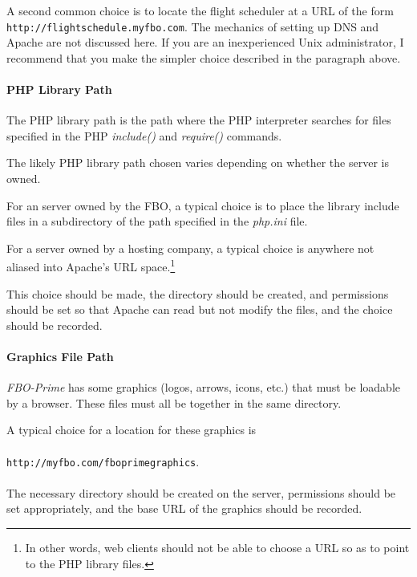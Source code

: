 \documentclass[letterpaper,10pt,titlepage]{article}
\newcommand{\productbasename}{FBO-Prime}
\begin{document}
A second common choice is to locate the flight scheduler at a URL of the form
\texttt{http://flightschedule.myfbo.com}.  The mechanics of setting up DNS and 
Apache are not discussed here.  If you are an inexperienced Unix administrator,
I recommend that you make the simpler choice described in the paragraph above.


\paragraph{PHP Library Path}

The PHP library path is the path where the PHP interpreter searches for
files specified in the PHP \emph{include()} and \emph{require()} commands.

The likely PHP library path chosen varies depending on whether the server is
owned.

For an server owned by the FBO, a typical choice is to place the library include files
in a subdirectory of the path specified in the \emph{php.ini} file.

For a server owned by a hosting company, a typical choice is anywhere not
aliased into Apache's URL space.\footnote{In other words, web clients should not be able to
choose a URL so as to point to the PHP library files.}

This choice should be made, the directory should be created, and permissions should be set
so that Apache can read but not modify the files, and the choice should be recorded.


\paragraph{Graphics File Path}

\emph{\productbasename{}} has some graphics (logos, arrows, icons, etc.) that must be
loadable by a browser.  These files must all be together in the same directory.

A typical choice for a location for these graphics is\\\\
\texttt{http://myfbo.com/fboprimegraphics}.\\\\

The necessary directory should be created on the server, permissions should be set appropriately,
and the base URL of the graphics should be recorded.
\end{document}
